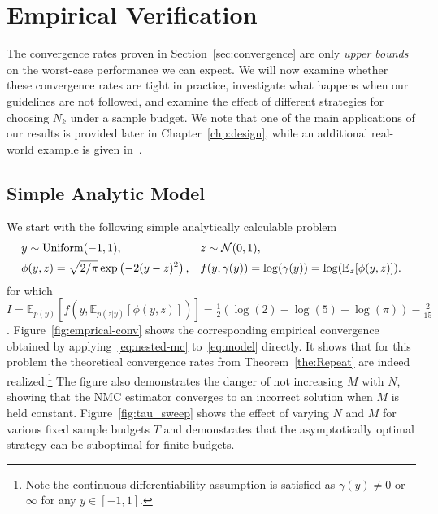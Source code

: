 
\section{Empirical Verification}
\label{sec:empirical}

The convergence rates proven in Section~\ref{sec:convergence} are only
\emph{upper bounds} on the worst-case performance we can expect. We will now
examine whether these convergence rates are tight in practice, investigate what happens
when our guidelines are not followed, and examine the effect of different strategies for
choosing $N_k$ under a sample budget.  We note that one of the main applications of
our results is provided later in Chapter~\ref{chp:design}, while an additional real-world
example is given in~\citep{rainforth2017pitfalls}.


\subsection{Simple Analytic Model}
\label{sec:simple}

We start with the following simple analytically calculable problem
\begin{equation}
\begin{aligned}
\label{eq:model}
& y \sim \mathrm{Uniform}(-1,1), &&
z \sim \mathcal{N}(0,1), \\
& \phi(y,z) = \sqrt{2/\pi}\exp\left(-2(y-z)^2\right), &&
f(y,\gamma(y)) = \log (\gamma (y)) = \log(\mathbb{E}_z[\phi(y,z)]).
\end{aligned}
\end{equation}
for which $I = \mathbb{E}_{p(y)}\left[f\left(y,\mathbb{E}_{p(z|y)}
\left[\phi(y,z)\right]\right)\right]=\frac{1}{2}\left(\log(2)-\log(5)-\log(\pi)\right)-\frac{2}{15}$.
Figure~\ref{fig:emprical-conv} shows the corresponding empirical convergence obtained by
applying~\eqref{eq:nested-mc} to~\eqref{eq:model} directly. It shows that for this
problem the theoretical convergence rates from Theorem~\ref{the:Repeat} are indeed
realized.\footnote{Note the continuous differentiability assumption is satisfied as $\gamma(y)\neq0$
or $\infty$ for any $y\in[-1,1]$.}
The figure also demonstrates the danger of not increasing
$M$ with $N$, showing that the NMC estimator converges to an incorrect solution when $M$
is held constant.  Figure~\ref{fig:tau_sweep} shows the effect of varying $N$ and $M$ for various
fixed sample budgets $T$ and demonstrates that the asymptotically optimal strategy can be suboptimal
for finite budgets.

